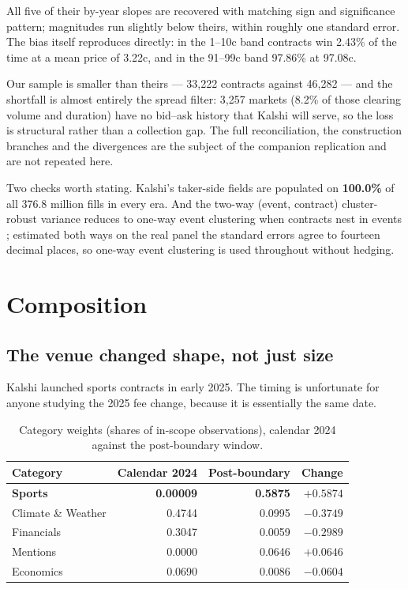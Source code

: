 \documentclass[preprint,12pt,authoryear]{elsarticle}
\begin{document}
All five of their by-year slopes are recovered with matching sign and
significance pattern; magnitudes run slightly below theirs, within roughly one
standard error. The bias itself reproduces directly: in the 1--10c band
contracts win 2.43\% of the time at a mean price of 3.22c, and in the 91--99c
band 97.86\% at 97.08c.

Our sample is smaller than theirs --- 33,222 contracts against 46,282 --- and
the shortfall is almost entirely the spread filter: 3,257 markets (8.2\% of
those clearing volume and duration) have no bid--ask history that Kalshi will
serve, so the loss is structural rather than a collection gap. The full
reconciliation, the construction branches and the divergences are the subject of
the companion replication and are not repeated here.

Two checks worth stating. Kalshi's taker-side fields are populated on
\textbf{100.0\%} of all 376.8 million fills in every era. And the two-way
(event, contract) cluster-robust variance reduces to one-way event clustering
when contracts nest in events \citep{cameron2011}; estimated both ways on the
real panel the standard errors agree to fourteen decimal places, so one-way
event clustering is used throughout without hedging.

\section{Composition}\label{sec:composition}

\subsection{The venue changed shape, not just size}

Kalshi launched sports contracts in early 2025. The timing is unfortunate for
anyone studying the 2025 fee change, because it is essentially the same date.

\begin{table}[htbp]
\centering
\caption{Category weights (shares of in-scope observations), calendar 2024
against the post-boundary window.}
\small
\begin{tabular}{lrrr}
\toprule
Category & Calendar 2024 & Post-boundary & Change \\
\midrule
\textbf{Sports}     & \textbf{0.00009} & \textbf{0.5875} & \textbf{$+0.5874$} \\
Climate \& Weather  & 0.4744 & 0.0995 & $-0.3749$ \\
Financials          & 0.3047 & 0.0059 & $-0.2989$ \\
Mentions            & 0.0000 & 0.0646 & $+0.0646$ \\
Economics           & 0.0690 & 0.0086 & $-0.0604$ \\
\bottomrule
\end{tabular}
\end{table}
\end{document}
